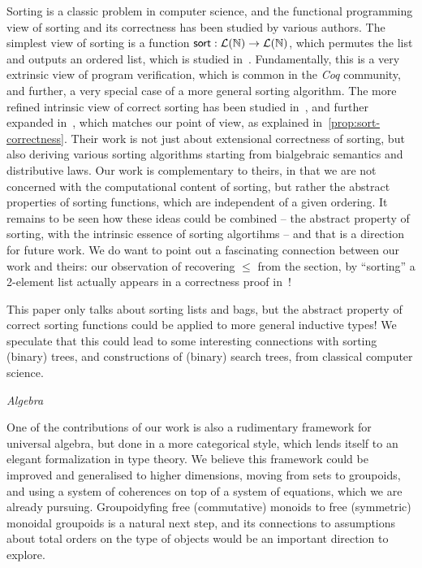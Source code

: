 Sorting is a classic problem in computer science, and the functional programming view of sorting and its correctness has
been studied by various authors.
%
The simplest view of sorting is a function $\operatorname{\mathsf{sort}}: \mathcal{L}(\mathbb{N}) \to \mathcal{L}(\mathbb{N})$,
which permutes the list and outputs an ordered list, which is studied in~\cite{appelVerifiedFunctionalAlgorithms2023}.
%
Fundamentally, this is a very extrinsic view of program verification, which is common in the \emph{Coq} community,
and further, a very special case of a more general sorting algorithm.
%
The more refined intrinsic view of correct sorting has been studied in~\cite{hinzeSortingBialgebrasDistributive2012},
and further expanded in~\cite{alexandruIntrinsicallyCorrectSorting2023}, which matches our point of view, as explained
in~\cref{prop:sort-correctness}.
%
Their work is not just about extensional correctness of sorting, but also deriving various sorting algorithms
starting from bialgebraic semantics and distributive laws.
%
Our work is complementary to theirs, in that we are not concerned with the computational content of sorting, but rather
the abstract properties of sorting functions, which are independent of a given ordering.
%
It remains to be seen how these ideas could be combined -- the abstract property of sorting, with the intrinsic essence
of sorting algortihms -- and that is a direction for future work.
%
We do want to point out a fascinating connection between our work and theirs: our observation of recovering $\leq$ from
the section, by ``sorting'' a 2-element list actually appears in a correctness proof
in~\cite[Section~4.6,pg.324]{hengleinSortingSearchingDistribution2013}!

This paper only talks about sorting lists and bags, but the abstract property of correct sorting functions could be
applied to more general inductive types! We speculate that this could lead to some interesting connections with sorting
(binary) trees, and constructions of (binary) search trees, from classical computer science.

\emph{Algebra}

One of the contributions of our work is also a rudimentary framework for universal algebra, but done in a more
categorical style, which lends itself to an elegant formalization in type theory.
%
We believe this framework could be improved and generalised to higher dimensions, moving from sets to groupoids,
and using a system of coherences on top of a system of equations, which we are already pursuing.
%
Groupoidyfing free (commutative) monoids to free (symmetric) monoidal groupoids is a natural next step, and its
connections to assumptions about total orders on the type of objects would be an important direction to explore.


